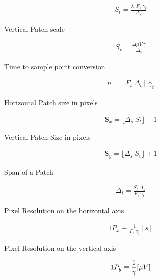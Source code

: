 \begin{subappendices}
\begin{align*}
S_t = \frac{ \lambda \;  \  F_s \ \gamma_t }{\Delta_s}
\end{align*}

Vertical Patch scale

\begin{align*}
S_v= \frac{\Delta \mu V \ \gamma}{\Delta_s} 
\end{align*}

Time to sample point conversion

\begin{align*}
n = \left\lfloor F_s \ \Delta_t \right\rfloor \ \gamma_t
\end{align*}

Horizontal Patch size in pixels

\begin{align*}
\mathbf{S}_x = \lfloor \Delta_s \; S_t \rfloor + 1
\end{align*}

Vertical Patch Size in pixels

\begin{align*}
\mathbf{S}_y = \lfloor \Delta_s \; S_v \rfloor + 1
\end{align*}

Span of a Patch

\begin{align*}
\Delta_t = \frac{S_t \ \Delta_s}{F_s \ \gamma_t} 
\end{align*}

Pixel Resolution on the horizontal axis

\begin{align*}
1 P_x \equiv \frac{1}{F_s  \; \gamma_t}  [\si{s}]
\end{align*}

Pixel Resolution on the vertical axis

\begin{align*}
1 P_y \equiv \frac{1}{\gamma}  [\si\mu{V}]
\end{align*}

\end{subappendices}